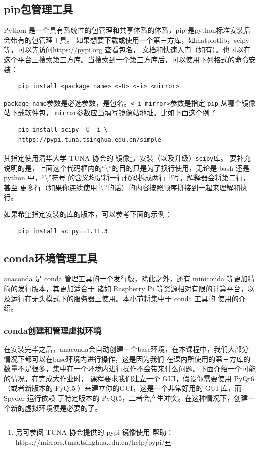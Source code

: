 \subsection{pip包管理工具}
Python 是一个具有系统性的包管理和共享体系的体系，pip 是python标准安装后会带有的包管理工具。
如果想要下载或使用一个第三方库，如matplotlib，scipy等，可以先访问https://pypi.org 查看包名，
文档和快速入门（如有）。也可以在这个平台上搜索第三方库。当搜索到一个第三方库后，可以使用下列格式的命令安装：
\lstset{language=bash}
\begin{lstlisting}
    pip install <package name> <-U> <-i> <mirror>
\end{lstlisting}
\texttt{package name}参数是必选参数，是包名。\texttt{<-i mirror>}参数是指定 \texttt{pip} 从哪个镜像站下载软件包，
\texttt{mirror}参数应当填写镜像站地址。比如下面这个例子
\begin{lstlisting}
    pip install scipy -U -i \
    https://pypi.tuna.tsinghua.edu.cn/simple
\end{lstlisting}
其指定使用清华大学 TUNA 协会的
镜像\footnote{另可参阅 TUNA 协会提供的 pypi 镜像使用
帮助：\\https://mirrors.tuna.tsinghua.edu.cn/help/pypi/}，安装（以及升级）\texttt{scipy}库。
要补充说明的是，上面这个代码框内的“\textbackslash ”的目的只是为了换行使用，无论是 bash 还是 python 中，“\textbackslash ”符号
的含义均是将一行代码拆成两行书写，解释器会将第二行，甚至
更多行（如果你连续使用“\textbackslash ”的话）的内容按照顺序拼接到一起来理解和执行。

如果希望指定安装的库的版本，可以参考下面的示例：
\begin{lstlisting}
    pip install scipy==1.11.3
\end{lstlisting}
\subsection{conda环境管理工具}
anaconda 是 conda 管理工具的一个发行版，除此之外，还有 miniconda 等更加精简的发行版本，其更加适合于
诸如 Raspberry Pi 等资源相对有限的计算平台，以及运行在无头模式下的服务器上使用。本小节将集中于 conda 工具的
使用的介绍。

\subsubsection{conda创建和管理虚拟环境}
在安装完毕之后，anaconda会自动创建一个base环境，在本课程中，我们大部分情况下都可以在base环境内进行操作，这是因为我们
在课内所使用的第三方库的数量不是很多，集中在一个环境内进行操作不会带来什么问题。下面介绍一个可能的情况，在完成大作业时，
课程要求我们建立一个 GUI，假设你需要使用 PyQt6 （或者新版本的 PyQt5 ）来建立你的GUI，这是一个非常好用的 GUI 库，而 Spyder 运行依赖
于特定版本的 PyQt5，二者会产生冲突。在这种情况下，创建一个新的虚拟环境便是必要的了。


